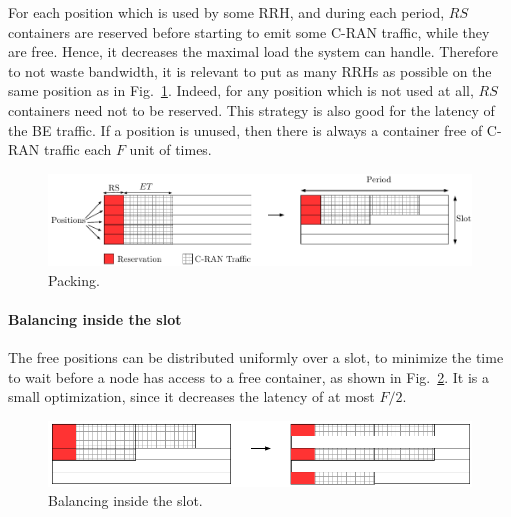 \documentclass[10pt, conference, letterpaper]{IEEEtran}
\begin{document}
For each position which is used by some RRH, and during each period, $RS$ containers are reserved before starting to emit some C-RAN traffic, while they are free. Hence, it decreases the maximal load the system can handle.
Therefore to not waste bandwidth, it is relevant to put as many RRHs as possible on the same position as in Fig.~\ref{fig:packing}. Indeed, for any position which is not used at all, $RS$ containers need not to be reserved. This strategy is also good for the latency of the BE traffic. If a position is unused, then there is always a container free of C-RAN traffic each $F$ unit of times. 

\begin{figure}[h!]
\begin{center}   

      \includegraphics[scale=0.5]{repart0}
     \caption{Packing.}\label{fig:packing}
     
\end{center}
  \end{figure}

\paragraph{Balancing inside the slot}

The free positions can be distributed uniformly over a slot, to minimize the time to wait before a node 
has access to a free container, as shown in Fig.~\ref{fig:slotbal}. It is a small optimization, since 
it decreases the latency of at most $F/2$.

\begin{figure}[h!]
\begin{center}   

      \includegraphics[scale=0.55]{repart1}
     \caption{Balancing inside the slot.}\label{fig:slotbal}
     
\end{center}
  \end{figure}
\end{document}
